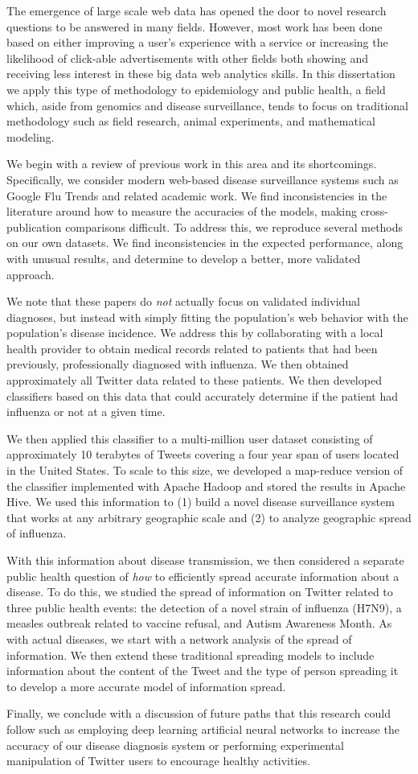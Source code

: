 
The emergence of large scale web data has opened the door to novel research questions to be answered in many fields. However, most work has been done based on either improving a user's experience with a service or increasing the likelihood of click-able advertisements with other fields both showing and receiving less interest in these big data web analytics skills. In this dissertation we apply this type of methodology to epidemiology and public health, a field which, aside from genomics and disease surveillance, tends to focus on traditional methodology such as field research, animal experiments, and mathematical modeling. 

We begin with a review of previous work in this area and its shortcomings. Specifically, we consider modern web-based disease surveillance systems such as Google Flu Trends and related academic work. We find inconsistencies in the literature around how to measure the accuracies of the models, making cross-publication comparisons difficult. To address this, we reproduce several methods on our own datasets. We find inconsistencies in the expected performance, along with unusual results, and determine to develop a better, more validated approach.

We note that these papers do \emph{not} actually focus on validated individual diagnoses, but instead with simply fitting the population's web behavior with the population's disease incidence. We address this by collaborating with a local health provider to obtain medical records related to patients that had been previously, professionally diagnosed with influenza. We then obtained approximately all Twitter data related to  these patients. We then developed classifiers based on this data that could accurately determine if the patient had influenza or not at a given time. 

We then applied this classifier to a multi-million user dataset consisting of approximately 10 terabytes of Tweets covering a four year span of users located in the United States. To scale to this size, we developed a map-reduce version of the classifier implemented with Apache Hadoop and stored the results in Apache Hive. We used this information to (1) build a novel disease surveillance system that works at any arbitrary geographic scale and (2) to analyze geographic spread of influenza.

With this information about disease transmission, we then considered a separate public health question of \emph{how} to efficiently spread accurate information about a disease. To do this, we studied the spread of information on Twitter related to three public health events: the detection of a novel strain of influenza (H7N9), a measles outbreak related to vaccine refusal, and Autism Awareness Month. As with actual diseases, we start with a network analysis of the spread of information. We then extend these traditional spreading models to include information about the content of the Tweet and the type of person spreading it to develop a more accurate model of information spread.

Finally, we conclude with a discussion of future paths that this research could follow such as employing deep learning artificial neural networks to increase the accuracy of our disease diagnosis system or performing experimental manipulation of Twitter users to encourage healthy activities. 
